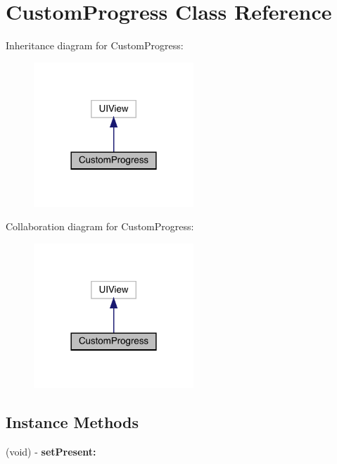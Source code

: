 \hypertarget{interface_custom_progress}{}\section{Custom\+Progress Class Reference}
\label{interface_custom_progress}


Inheritance diagram for Custom\+Progress\+:\nopagebreak
\begin{figure}[H]
\begin{center}
\leavevmode
\includegraphics[width=170pt]{interface_custom_progress__inherit__graph}
\end{center}
\end{figure}


Collaboration diagram for Custom\+Progress\+:\nopagebreak
\begin{figure}[H]
\begin{center}
\leavevmode
\includegraphics[width=170pt]{interface_custom_progress__coll__graph}
\end{center}
\end{figure}
\subsection*{Instance Methods}
\begin{DoxyCompactItemize}
\item 
\mbox{\label{interface_custom_progress_a671736853acf317818076dfa273f1489}} 
(void) -\/ {\bfseries set\+Present\+:}
\end{DoxyCompactItemize}
